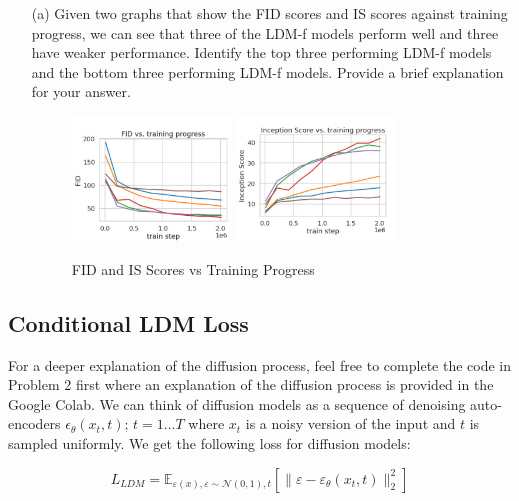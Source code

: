 \documentclass[a4paper]{article}
\begin{document}
\begin{itemize}
    \item [(a)]
    Given two graphs that show the FID scores and IS scores against training progress, we can see that three of the LDM-f models perform well and three have weaker performance. Identify the top three performing LDM-f models and the bottom three performing LDM-f models. Provide a brief explanation for your answer.

     \begin{figure}[htbp]
        \centering
        \includegraphics[width=0.4\textwidth]{fid_scores.png} \hfill
        \includegraphics[width=0.4\textwidth]{is_scores.png}
        \caption{FID and IS Scores vs Training Progress}
        \label{fig:is}
    \end{figure}

\end{itemize}

\subsection{Conditional LDM Loss}
For a deeper explanation of the diffusion process, feel free to complete the code in Problem 2 first where an explanation of the diffusion process is provided in the Google Colab. We can think of diffusion models as a sequence of denoising auto-encoders \(\epsilon_{\theta}(x_t, t)\); \(t = 1...T\) where \(x_t\) is a noisy version of the input and  \(t\) is sampled uniformly.  We get the following loss for diffusion models:

\[L_{LDM} = \mathbb{E}_{\varepsilon(x), \varepsilon \sim \mathcal{N}(0, 1), t} [\| \varepsilon - \varepsilon_{\theta}(x_t, t) \|_2^2 ] \]
\end{document}
